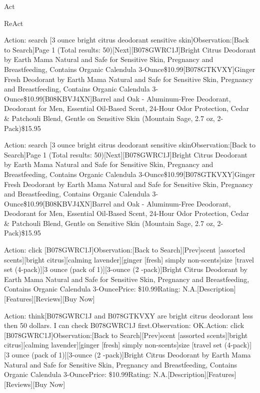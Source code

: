 \documentclass[
]{article}
\begin{document}
Act

ReAct

Action: search {[}3 ounce bright citrus deodorant sensitive
skin{]}Observation:{[}Back to Search{]}Page 1 (Total results:
50){[}Next{]}{[}B078GWRC1J{]}Bright Citrus Deodorant by Earth Mama
\textbar{} Natural and Safe for Sensitive Skin, Pregnancy and
Breastfeeding, Contains Organic Calendula
3-Ounce\$10.99{[}B078GTKVXY{]}Ginger Fresh Deodorant by Earth Mama
\textbar{} Natural and Safe for Sensitive Skin, Pregnancy and
Breastfeeding, Contains Organic Calendula
3-Ounce\$10.99{[}B08KBVJ4XN{]}Barrel and Oak - Aluminum-Free Deodorant,
Deodorant for Men, Essential Oil-Based Scent, 24-Hour Odor Protection,
Cedar \& Patchouli Blend, Gentle on Sensitive Skin (Mountain Sage, 2.7
oz, 2-Pack)\$15.95

Action: search {[}3 ounce bright citrus deodorant sensitive
skinObservation:{[}Back to Search{]}Page 1 (Total results:
50){[}Next{]}{[}B078GWRC1J{]}Bright Citrus Deodorant by Earth Mama
\textbar{} Natural and Safe for Sensitive Skin, Pregnancy and
Breastfeeding, Contains Organic Calendula
3-Ounce\$10.99{[}B078GTKVXY{]}Ginger Fresh Deodorant by Earth Mama
\textbar{} Natural and Safe for Sensitive Skin, Pregnancy and
Breastfeeding, Contains Organic Calendula
3-Ounce\$10.99{[}B08KBVJ4XN{]}Barrel and Oak - Aluminum-Free Deodorant,
Deodorant for Men, Essential Oil-Based Scent, 24-Hour Odor Protection,
Cedar \& Patchouli Blend, Gentle on Sensitive Skin (Mountain Sage, 2.7
oz, 2-Pack)\$15.95

Action: click {[}B078GWRC1J{]}Observation:{[}Back to
Search{]}{[}Prev{]}scent {[}assorted scents{]}{[}bright
citrus{]}{[}calming lavender{]}{[}ginger {[}fresh{]} simply
non-scents{]}size {[}travel set (4-pack){]}{[}3 ounce (pack of
1){]}{[}3-ounce (2 -pack){]}Bright Citrus Deodorant by Earth Mama
\textbar{} Natural and Safe for Sensitive Skin, Pregnancy and
Breastfeeding, Contains Organic Calendula 3-OuncePrice: \$10.99Rating:
N.A.{[}Description{]}{[}Features{]}{[}Reviews{]}{[}Buy Now{]}

Action: think{[}B078GWRC1J and B078GTKVXY are bright citrus deodorant
less then 50 dollars. I can check B078GWRC1J first.Observation:
OK.Action: click {[}B078GWRC1J{]}Observation:{[}Back to
Search{]}{[}Prev{]}scent {[}assorted scents{]}{[}bright
citrus{]}{[}calming lavender{]}{[}ginger {[}fresh{]} simply
non-scents{]}size {[}travel set (4-pack){]}{[}3 ounce (pack of
1){]}{[}3-ounce (2 -pack){]}Bright Citrus Deodorant by Earth Mama
\textbar{} Natural and Safe for Sensitive Skin, Pregnancy and
Breastfeeding, Contains Organic Calendula 3-OuncePrice: \$10.99Rating:
N.A.{[}Description{]}{[}Features{]}{[}Reviews{]}{[}Buy Now{]}
\end{document}
